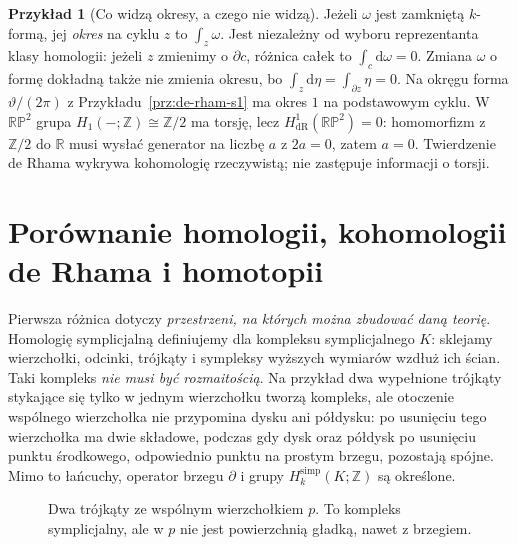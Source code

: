\documentclass[11pt,a4paper,oneside]{report}
\newcommand{\R}{\mathbb{R}}
\newcommand{\Z}{\mathbb{Z}}
\newcommand{\dd}{\mathrm d}
\theoremstyle{plain}
\theoremstyle{definition}
\newtheorem{przyklad}[twierdzenie]{Przykład}
\theoremstyle{remark}
\begin{document}
\begin{przyklad}[Co widzą okresy, a czego nie widzą]
Jeżeli $\omega$ jest zamkniętą $k$-formą, jej
\emph{okres} na cyklu $z$ to $\int_z\omega$.
Jest niezależny od wyboru reprezentanta klasy
homologii: jeżeli $z$ zmienimy o $\partial c$,
różnica całek to $\int_c\dd\omega=0$.
Zmiana $\omega$ o formę dokładną także nie zmienia
okresu, bo $\int_z\dd\eta=\int_{\partial z}\eta=0$.
Na okręgu forma $\vartheta/(2\pi)$ z
Przykładu~\ref{prz:de-rham-s1} ma okres $1$ na
podstawowym cyklu. W $\mathbb{RP}^2$ grupa
$H_1(-;\Z)\cong\Z/2$ ma torsję, lecz
$H^1_{\mathrm{dR}}(\mathbb{RP}^2)=0$:
homomorfizm z $\Z/2$ do $\R$ musi wysłać
generator na liczbę $a$ z $2a=0$, zatem $a=0$.
Twierdzenie de Rhama wykrywa kohomologię
rzeczywistą; nie zastępuje informacji o torsji.
\end{przyklad}

\section{Porównanie homologii, kohomologii de Rhama i homotopii}
\label{sec:porownanie-trzech-teorii}

Pierwsza różnica dotyczy \emph{przestrzeni, na których
można zbudować daną teorię}. Homologię symplicjalną
definiujemy dla kompleksu symplicjalnego $K$:
sklejamy wierzchołki, odcinki, trójkąty i sympleksy
wyższych wymiarów wzdłuż ich ścian. Taki kompleks
\emph{nie musi być rozmaitością}. Na przykład dwa
wypełnione trójkąty stykające się tylko w jednym
wierzchołku tworzą kompleks, ale otoczenie
wspólnego wierzchołka nie przypomina dysku
ani półdysku: po usunięciu tego wierzchołka ma dwie
składowe, podczas gdy dysk oraz półdysk po usunięciu
punktu środkowego, odpowiednio punktu na prostym brzegu,
pozostają spójne. Mimo to łańcuchy, operator brzegu
$\partial$ i grupy $H_k^{\mathrm{simp}}(K;\Z)$
są określone.

\begin{figure}[!htbp]
\centering
{}
\caption{Dwa trójkąty ze wspólnym wierzchołkiem $p$.
To kompleks symplicjalny, ale w $p$ nie jest
powierzchnią gładką, nawet z brzegiem.}
\label{fig:kompleks-nie-rozmaitosc}
\end{figure}
\end{document}
